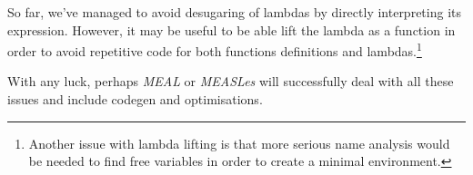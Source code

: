 So far, we've managed to avoid desugaring of lambdas by directly interpreting its expression. However, it may be useful to be able lift the lambda as a function in order to avoid repetitive code for both functions definitions and lambdas.\footnote{Another issue with lambda lifting is that more serious name analysis would be needed to find free variables in order to create a minimal environment.}

With any luck, perhaps \textit{MEAL} or \textit{MEASLes} will successfully deal with all these issues and include codegen and optimisations.
